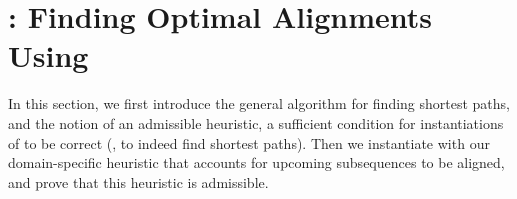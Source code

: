 \section{\astarix: Finding Optimal Alignments Using \A} \label{TRIEsec:astarix-algo}
In this section, we first introduce the general \A algorithm for finding
shortest paths, and the notion of an admissible heuristic, a sufficient
condition for instantiations of \A to be correct (\ie, to indeed find shortest
paths). Then we instantiate \A with our domain-specific heuristic that accounts
for upcoming subsequences to be aligned, and prove that this heuristic is
admissible.


